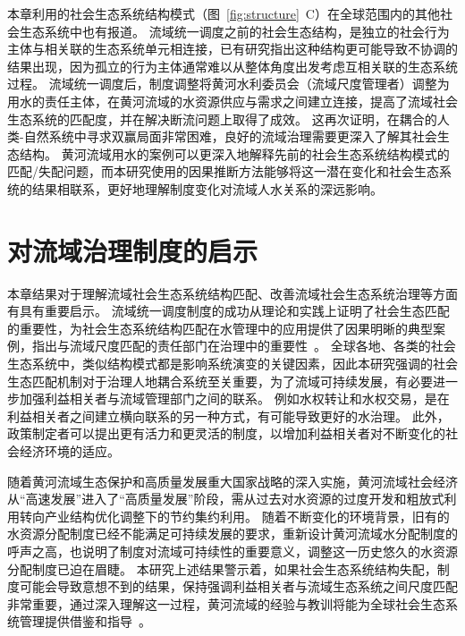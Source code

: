 本章利用的社会\textendash{}生态系统结构模式（图~\ref{fig:structure}~C）在全球范围内的其他社会\textendash{}生态系统中也有报道。
流域统一调度之前的社会\textendash{}生态结构，是独立的社会行为主体与相关联的生态系统单元相连接，已有研究指出这种结构更可能导致不协调的结果出现，因为孤立的行为主体通常难以从整体角度出发考虑互相关联的生态系统过程\cite{sayles2017,sayles2019,cai2016,bergsten2019}。
流域统一调度后，制度调整将黄河水利委员会（流域尺度管理者）调整为用水的责任主体，在黄河流域的水资源供应与需求之间建立连接，提高了流域社会\textendash{}生态系统的匹配度，并在解决断流问题上取得了成效\cite{cumming2020a,wang2019b,wang2019c}。
这再次证明，在耦合的人类-自然系统中寻求双赢局面非常困难\cite{hegwood2022}，良好的流域治理需要更深入了解其社会\textendash{}生态结构\cite{bergsten2019, sayles2019}。
黄河流域用水的案例可以更深入地解释先前的社会\textendash{}生态系统结构模式的匹配/失配问题，而本研究使用的因果推断方法能够将这一潜在变化和社会\textendash{}生态系统的结果相联系，更好地理解制度变化对流域人\textendash{}水关系的深远影响。

\section{对流域治理制度的启示}

本章结果对于理解流域社会\textendash{}生态系统结构匹配、改善流域社会\textendash{}生态系统治理等方面有具有重要启示。
流域统一调度制度的成功从理论和实践上证明了社会\textendash{}生态匹配的重要性，为社会\textendash{}生态系统结构匹配在水管理中的应用提供了因果明晰的典型案例，指出与流域尺度匹配的责任部门在治理中的重要性~\cite{bodin2017b, ostrom2009, reyers2018}。
全球各地、各类的社会\textendash{}生态系统中，类似结构模式都是影响系统演变的关键因素，因此本研究强调的社会\textendash{}生态匹配机制对于治理人地耦合系统至关重要，为了流域可持续发展，有必要进一步加强利益相关者与流域管理部门之间的联系。
例如水权转让和水权交易，是在利益相关者之间建立横向联系的另一种方式，有可能导致更好的水治理\cite{zhenghang2019}。
此外，政策制定者可以提出更有活力和更灵活的制度，以增加利益相关者对不断变化的社会经济环境的适应\cite{reyers2018}。

随着黄河流域生态保护和高质量发展重大国家战略的深入实施，黄河流域社会经济从“高速发展”进入了“高质量发展”阶段，需从过去对水资源的过度开发和粗放式利用转向产业结构优化调整下的节约集约利用。
随着不断变化的环境背景，旧有的水资源分配制度已经不能满足可持续发展的要求，重新设计黄河流域水分配制度的呼声之高，也说明了制度对流域可持续性的重要意义，调整这一历史悠久的水资源分配制度已迫在眉睫\cite{wang2019a}。
本研究上述结果警示着，如果社会\textendash{}生态系统结构失配，制度可能会导致意想不到的结果，保持强调利益相关者与流域生态系统之间尺度匹配非常重要，通过深入理解这一过程，黄河流域的经验与教训将能为全球社会\textendash{}生态系统管理提供借鉴和指导~\cite{hegwood2022, muneepeerakul2017, leslie2015}。

